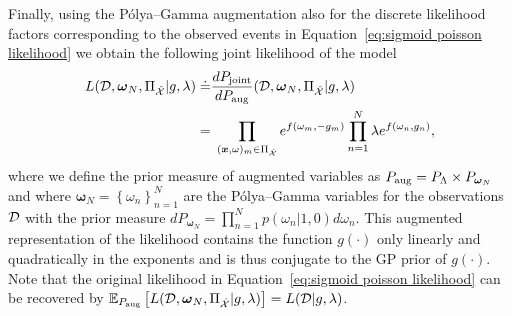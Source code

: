 \documentclass[twoside,11pt]{article}
\newcommand{\dataset}{{\cal D}}
\newcommand{\EE}[2]{\mathbb{E}_{#1}\left[ #2 \right]}
\newcommand{\set}[1]{\left\lbrace #1 \right\rbrace}
\newcommand{\bx}{\boldsymbol{x}}
\newcommand{\bomega}{\boldsymbol{\omega}}
\newcommand{\X}{\mathcal{X}}
\begin{document}
Finally, using the P\'olya--Gamma augmentation also for the discrete likelihood factors corresponding to the observed events in Equation~\eqref{eq:sigmoid poisson likelihood} we obtain the following joint likelihood of the model
\begin{equation}\label{eq:augmented likelihood}
\begin{split}
L(\dataset, \bomega_N, \Pi_{\hat{\X}}\vert g, \lambda) \doteq &
\frac{dP_{\rm joint}}{dP_{\rm aug}} (\dataset, \bomega_N, \Pi_{\hat{\X}}\vert g, \lambda) \\
= & \;  \prod_{(\bx,\omega)_m\in\Pi_{\hat{\X}}} e^{f(\omega_m,-g_m)}  \prod_{n=1}^N \lambda e^{f(\omega_n,g_n)},
\end{split}
\end{equation}
where we define the prior measure of augmented variables as $P_{\rm aug} = P_{\Lambda} \times P_{\bomega_N}$ and where $\bomega_N=\set{\omega_n}_{n=1}^N$ are the P\'olya--Gamma variables for the observations $\dataset$ with the prior measure $dP_{\bomega_N} = \prod_{n=1}^Np(\omega_n\vert 1, 0)d\omega_n$. This augmented representation of the likelihood contains the function $g(\cdot)$ only linearly and quadratically in the exponents and is thus conjugate to the GP prior of $g(\cdot)$. Note that the original likelihood in Equation~\eqref{eq:sigmoid poisson likelihood} can be recovered by $\EE{P_{\rm aug}}{L(\dataset, \bomega_N, \Pi_{\hat{\X}} \vert g, \lambda)} = L(\dataset \vert g, \lambda)$.
\end{document}
